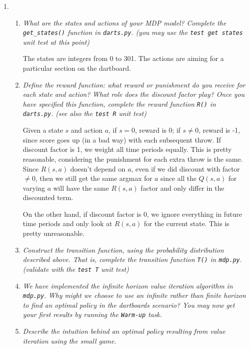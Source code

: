 \documentclass{article}
\begin{document}
\begin{enumerate}
\item
  \begin{enumerate}
  \item \emph{What are the states and actions of your MDP model?
  Complete the \texttt{get\_states()} function in \texttt{darts.py}. (you may use
  the \texttt{test get states} unit test at this point)}

  The states are integers from 0 to 301. The actions are aiming for a
  particular section on the dartboard.  

  \item \emph{Define the reward function: what reward or punishment
  do you receive for each state and action? What role does the discount
  factor play? Once you have specified this function, complete the
  reward function \texttt{R()} in \texttt{darts.py}. (see also the 
  \texttt{test R} unit test)}

  Given a state $s$ and action $a$, if $s=0$, reward is 0; if $s\neq 0$,
  reward is -1, since score goes up (in a bad way) with each subsequent
  throw. If discount factor is 1, we weight all time periods equally.
  This is pretty reasonable, considering the punishment for each extra
  throw is the same. Since $R(s,a)$ doesn't depend on $a$, even if we
  did discount with factor $\neq 0$, then we still get the same argmax
  for $a$ since all the $Q(s,a)$ for varying $a$ will have the same
  $R(s,a)$ factor and only differ in the discounted term. 

  On the other hand, if discount factor is 0, we ignore everything in 
  future time periods and only look at $R(s,a)$ for the current state.
  This is pretty unreasonable. 

  \item \emph{Construct the transition function, using the probability
  distribution described above. That is, complete the transition function 
  \texttt{T()} in \texttt{mdp.py}. (validate with the \texttt{test T} unit test)}

  \item \emph{We have implemented the infinite horizon value iteration
  algorithm in \texttt{mdp.py}. Why might we choose to use an infinite rather
  than finite horizon to find an optimal policy in the dartboards scenario? 
  You may now get your first results by running the \texttt{Warm-up} task.}

  \item \emph{Describe the intuition behind an optimal policy resulting
  from value iteration using the small game.}


\end{enumerate}
\end{enumerate}
\end{document}
